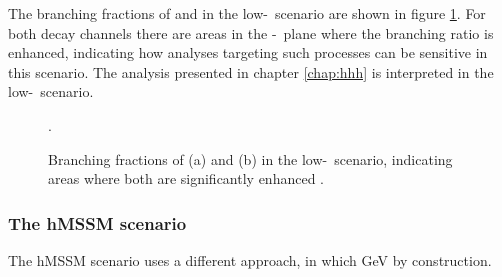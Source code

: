 The branching fractions of \Htohh and \AtoZh in the low-\tanb~scenario are shown in
figure \ref{fig:lowtbhigh_br}. For both decay channels there are areas in the \mA-\tanb~plane
where the branching ratio is enhanced, indicating how analyses targeting such processes 
can be sensitive in this scenario. %
The analysis presented in chapter \ref{chap:hhh} is interpreted
in the low-\tanb~scenario.

\begin{figure}[h!]
\begin{center}
\end{center}
\caption{Branching fractions of (a) \Htohh and (b) \AtoZh in the low-\tanb~scenario, indicating 
areas where both are significantly enhanced \cite{MSSM-lowtanb}.}
\label{fig:lowtbhigh_br}.
\end{figure}

\subsubsection{The hMSSM scenario}
\label{sec:theory_BSM_models_hMSSM}
The hMSSM scenario \cite{hMSSM-1,hMSSM-2} uses a different approach, in
which  GeV by construction. 

